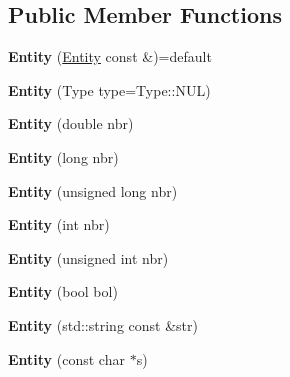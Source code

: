 \subsection*{Public Member Functions}
\begin{DoxyCompactItemize}
\item 
\mbox{\label{classzany_1_1_entity_a01477d997fda0587f327f987aea6c168}} 
{\bfseries Entity} (\hyperlink{classzany_1_1_entity}{Entity} const \&)=default
\item 
\mbox{\label{classzany_1_1_entity_ad10aae47371332c96e4f2c8cc614f5e3}} 
{\bfseries Entity} (Type type=Type\+::\+N\+UL)
\item 
\mbox{\label{classzany_1_1_entity_a144fdfaeb805515baa69380c0c1595ff}} 
{\bfseries Entity} (double nbr)
\item 
\mbox{\label{classzany_1_1_entity_a87cd79062899647c63e4b0b407e6e272}} 
{\bfseries Entity} (long nbr)
\item 
\mbox{\label{classzany_1_1_entity_aa634ddfdebe96ff05458fa992d9c5ef8}} 
{\bfseries Entity} (unsigned long nbr)
\item 
\mbox{\label{classzany_1_1_entity_a36cc88188f6188a8b5f25861371dac71}} 
{\bfseries Entity} (int nbr)
\item 
\mbox{\label{classzany_1_1_entity_a91dd25a738255565138546dfdf1ce7a1}} 
{\bfseries Entity} (unsigned int nbr)
\item 
\mbox{\label{classzany_1_1_entity_a3fe428e713937a4773f2543362ea394c}} 
{\bfseries Entity} (bool bol)
\item 
\mbox{\label{classzany_1_1_entity_a7ef279496a4ae34ba31caeee41466548}} 
{\bfseries Entity} (std\+::string const \&str)
\item 
\mbox{\label{classzany_1_1_entity_a4ee47f00ccba139a4914f8ec6eedb824}} 
{\bfseries Entity} (const char $\ast$s)
\item 
\mbox{\label{classzany_1_1_entity_aa66f81c7326eaadda5117a743c42b5eb}} 

\end{DoxyCompactItemize}
